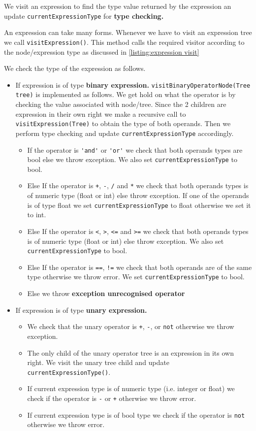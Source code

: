 We visit an expression to find the  type value returned by the expression an update \verb!currentExpressionType! for \textbf{type checking.}

An expression can take many forms. Whenever we have to visit an expression tree we call  \verb!visitExpression()!. This method calls the required visitor according to the node/expression type as discussed in \ref{listing:expression visit}

We check the type of the expression as follows.
\begin{itemize}
    \item If expression is of type \textbf{binary expression.}
    \verb!visitBinaryOperatorNode(Tree tree)! is implemented as follows. We get hold on what the operator is by checking the value associated with node/tree. Since the 2 children are expression in their own right we make a recursive call to \verb!visitExpression(Tree)! to obtain the type of both operands. Then we perform type checking and update \verb!currentExpressionType! accordingly.
    \begin{itemize}
        \item If the operator is \verb!'and'! or \verb!'or'! we check that both operands types are bool else we throw exception. We  also set  \verb!currentExpressionType! to bool. 
        \item Else If the operator is \verb!+!, \verb!-!, \verb!/! and \verb!*!  we check that both operands types is of numeric type (float or int) else  throw exception. If one of the operands is of type float we set \verb!currentExpressionType! to float otherwise we set it to int.
        \item Else If the operator is \verb!<!, \verb!>!, \verb!<=! and \verb!>=!  we check that both operands types is of numeric type (float or int) else  throw exception. We also set \verb!currentExpressionType! to bool.
        \item Else If the operator is \verb!==!, \verb|!=| we check that both operands are of the same type otherwise we throw error. We set \verb!currentExpressionType! to bool. 
        \item Else we throw \textbf{exception unrecognised operator}
    \end{itemize}
  
  
    \item If expression is of type \textbf{unary expression.}
    \begin{itemize}
        \item We check that the unary operator is \verb!+!, \verb!-!, or \verb!not! otherwise we throw exception. \item The only child of the unary operator tree is an expression in its own right. We visit the unary tree child and update \verb!currentExpressionType()!.
        \item If current expression type is of numeric type (i.e. integer or float) we check if the operator is \verb!-! or \verb!+! otherwise we throw error.
        \item If current expression type is of bool type we check if the operator is \verb!not! otherwise we throw error.
    \end{itemize}
  

\end{itemize}
